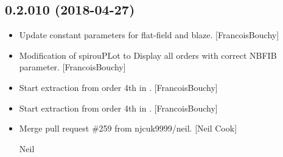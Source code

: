 \documentclass[a4paper,10pt,english]{report}
\begin{document}
\subsection{0.2.010 (2018-04-27)}
\label{\detokenize{misc/changelog:id451}}\begin{itemize}
\item {} 
Update constant parameters for flat-field and blaze. {[}FrancoisBouchy{]}

\item {} 
Modification of spirouPLot to Display all orders with correct NBFIB
parameter. {[}FrancoisBouchy{]}

\item {} 
Start extraction from order 4th in .
{[}FrancoisBouchy{]}

\item {} 
Start extraction from order 4th in . {[}FrancoisBouchy{]}

\item {} 
Merge pull request \#259 from njcuk9999/neil. {[}Neil Cook{]}

Neil

\end{itemize}
\end{document}
